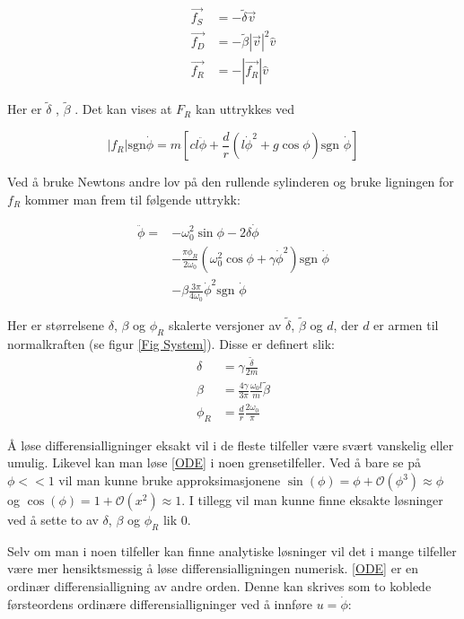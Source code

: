 \documentclass[5p]{elsarticle}
\begin{document}
\begin{align}
	\vec{f_S} & = -\tilde{\delta} \vec{v} 			\\
	\vec{f_D} & = -\tilde{\beta}|\vec{v}|^2\hat{v}  \\
	\vec{f_R} & = -|\vec{f_R}|\hat{v}				
\end{align}

Her er \(\tilde{\delta}\) , \(\tilde{\beta}\) .
Det kan vises at \(F_R\) kan uttrykkes ved

\begin{equation}
	|f_R|\text{sgn}\dot{\phi} =
	m\left[
		cl\ddot{\phi}+\frac{d}{r}
		\left(l\dot{\phi}^2 + g\cos\phi\right)
		\text{sgn }\dot{\phi}
	\right]
\end{equation}

Ved å bruke Newtons andre lov på den rullende sylinderen 
og bruke ligningen for \(f_R\) kommer man frem til følgende uttrykk:

\begin{equation}
	\begin{split}
		\label{ODE}	
		\ddot{\phi} = 	
		&- \omega_0^2\sin\phi - 2\delta\dot{\phi}	\\
		&- \frac{\pi\phi_R}{2\omega_0}
		\left(\omega_0^2\cos\phi + \gamma\dot{\phi}^2\right) \text{sgn } \dot{\phi} \\
		&- \beta \frac{3\pi}{4\omega_0}\dot{\phi}^2\text{sgn }\dot{\phi} 
	\end{split}
\end{equation}

Her er størrelsene \(\delta\), \(\beta\) og \(\phi_R\) skalerte versjoner av 
\(\tilde{\delta}\), \(\tilde{\beta}\) og \(d\), der \(d\) er armen til normalkraften (se figur \ref{Fig System}).
Disse er definert slik:
\begin{subequations}
    \begin{align}
        \delta & = \gamma\frac{\tilde{\delta}}{2m} \\
        \beta & = \frac{4\gamma}{3\pi}\frac{\omega_0l}{m}\tilde{\beta} \\
        \phi_R & = \frac{d}{r}\frac{2\omega_0}{\pi}
    \end{align}
\end{subequations}

Å løse differensialligninger eksakt vil i de fleste tilfeller være svært vanskelig eller umulig.
Likevel kan man løse \eqref{ODE} i noen grensetilfeller. Ved å bare se på \(\phi << 1\) vil man kunne
bruke approksimasjonene 
\(\sin(\phi) = \phi + \mathcal{O}(\phi^3) \approx \phi\) og 
\(\cos(\phi) = 1 + \mathcal{O}(x^2) \approx 1\).
I tillegg vil man kunne finne eksakte løsninger ved å sette to av \(\delta\), \(\beta\) og \(\phi_R\) lik 0.
\par
Selv om man i noen tilfeller kan finne analytiske løsninger 
vil det i mange tilfeller være mer hensiktsmessig å løse differensialligningen numerisk.
\eqref{ODE} er en ordinær differensialligning av andre orden. 
Denne kan skrives som to koblede førsteordens ordinære differensialligninger ved å innføre \(u = \dot{\phi}\):
\end{document}
